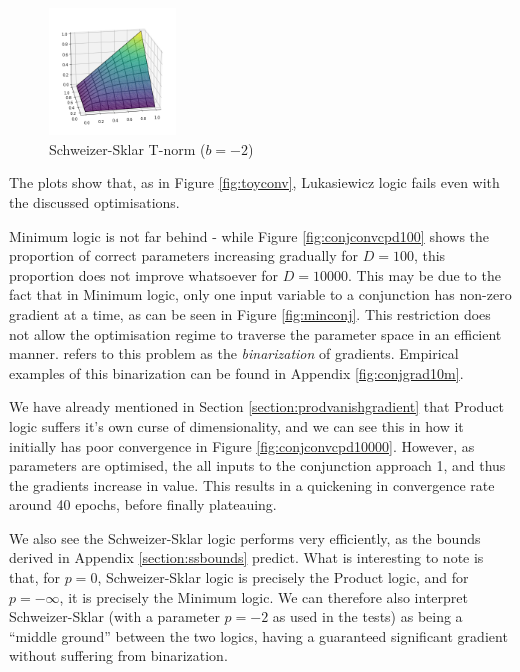 \begin{figure}
    \centering
    \vspace{-35.0pt}
    \includegraphics[width=0.30\textwidth, height=0.30\textwidth]{imgs/fuzzy_ss-2_and.png}
    \vspace{-10.0pt}
    \caption[width=0.3\textwidth]{Schweizer-Sklar T-norm ($b=-2$)}
    \label{fig:ssand}
\end{figure}

The plots show that, as in Figure \ref{fig:toyconv}, Lukasiewicz logic fails even with the discussed optimisations. 

Minimum logic is not far behind - while Figure \ref{fig:conjconvcpd100} shows the proportion of correct parameters increasing gradually for $D=100$, this proportion does not improve whatsoever for $D=10000$. This may be due to the fact that in Minimum logic, only one input variable to a conjunction has non-zero gradient at a time, as can be seen in Figure \ref{fig:minconj}. This restriction does not allow the optimisation regime to traverse the parameter space in an efficient manner. \cite{analyzefuzzy} refers to this problem as the \textit{binarization} of gradients. Empirical examples of this binarization can be found in Appendix \ref{fig:conjgrad10m}.

We have already mentioned in Section \ref{section:prodvanishgradient} that Product logic suffers it's own curse of dimensionality, and we can see this in how it initially has poor convergence in Figure \ref{fig:conjconvcpd10000}. However, as parameters are optimised, the all inputs to the conjunction approach 1, and thus the gradients increase in value. This results in a quickening in convergence rate around 40 epochs, before finally plateauing.

We also see the Schweizer-Sklar logic performs very efficiently, as the bounds derived in Appendix \ref{section:ssbounds} predict. What is interesting to note is that, for $p=0$, Schweizer-Sklar logic is precisely the Product logic, and for $p=-\infty$, it is precisely the Minimum logic. We can therefore also interpret Schweizer-Sklar (with a parameter $p=-2$ as used in the tests) as being a ``middle ground'' between the two logics, having a guaranteed significant gradient without suffering from binarization. 

